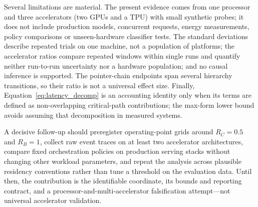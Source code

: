 Several limitations are material. The present evidence comes from one
processor and three accelerators (two GPUs and a TPU) with small synthetic
probes; it does not include production models, concurrent requests, energy
measurements, policy comparisons or unseen-hardware classifier tests. The
standard deviations describe repeated trials on one machine, not a population
of platforms; the accelerator ratios compare repeated windows within single
runs and quantify neither run-to-run uncertainty nor a hardware population; and
no causal inference is supported. The pointer-chain endpoints span several
hierarchy transitions, so their ratio is not a universal effect size. Finally,
Equation~\eqref{eq:latency_decomp} is an accounting identity only when its terms
are defined as non-overlapping critical-path contributions; the max-form lower
bound avoids assuming that decomposition in measured systems.

A decisive follow-up should preregister operating-point grids around
$R_C=0.5$ and $R_B=1$, collect raw event traces on at least two accelerator
architectures, compare fixed orchestration policies on production serving
stacks without changing other workload parameters, and repeat the analysis
across plausible residency conventions rather than tune a threshold on the
evaluation data. Until then, the contribution is the identifiable coordinate,
its bounds and reporting contract, and a processor-and-multi-accelerator
falsification attempt---not universal accelerator validation.
